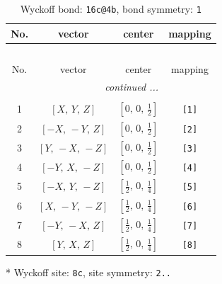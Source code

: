 \documentclass[fleqn,8pt]{jsarticle}
\begin{document}
\begin{longtable}{cccc}
\caption{Wyckoff bond: {\tt 16c@4b}, bond symmetry: {\tt 1}}
 \\
 \hline \hline
No. & vector & center & mapping \\ \hline \endfirsthead

\multicolumn{3}{l}{\tablename\ \thetable{}} \\
 \hline \hline
No. & vector & center & mapping \\ \hline \endhead

 \hline \hline
\multicolumn{3}{r}{\footnotesize\it continued ...} \\ \endfoot

 \hline \hline
\multicolumn{3}{r}{} \\ \endlastfoot

1 & $\left[ X,\, Y,\, Z \right]$ & $\left[ 0,\, 0,\, \frac{1}{2} \right]$ & {\tt [1]} \\ \hline
2 & $\left[ - X,\, - Y,\, Z \right]$ & $\left[ 0,\, 0,\, \frac{1}{2} \right]$ & {\tt [2]} \\ \hline
3 & $\left[ Y,\, - X,\, - Z \right]$ & $\left[ 0,\, 0,\, \frac{1}{2} \right]$ & {\tt [3]} \\ \hline
4 & $\left[ - Y,\, X,\, - Z \right]$ & $\left[ 0,\, 0,\, \frac{1}{2} \right]$ & {\tt [4]} \\ \hline
5 & $\left[ - X,\, Y,\, - Z \right]$ & $\left[ \frac{1}{2},\, 0,\, \frac{1}{4} \right]$ & {\tt [5]} \\ \hline
6 & $\left[ X,\, - Y,\, - Z \right]$ & $\left[ \frac{1}{2},\, 0,\, \frac{1}{4} \right]$ & {\tt [6]} \\ \hline
7 & $\left[ - Y,\, - X,\, Z \right]$ & $\left[ \frac{1}{2},\, 0,\, \frac{1}{4} \right]$ & {\tt [7]} \\ \hline
8 & $\left[ Y,\, X,\, Z \right]$ & $\left[ \frac{1}{2},\, 0,\, \frac{1}{4} \right]$ & {\tt [8]} \\
\end{longtable}
* Wyckoff site: {\tt 8c}, site symmetry: {\tt 2..}
\renewcommand{\arraystretch}{1.2}
\end{document}
